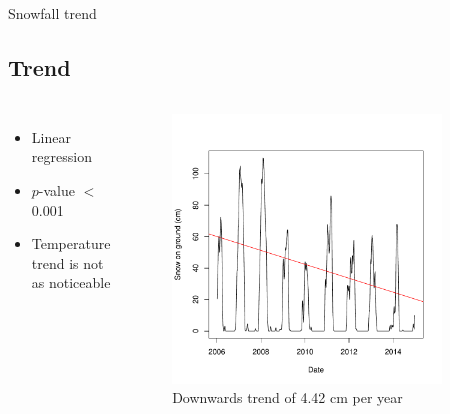 \documentclass{beamer}
\begin{document}
\begin{frame}{Snowfall trend}

\subsection{Trend}

\begin{columns}


{\small
\begin{itemize}
\item Linear regression
\item $p$-value $<$ 0.001
\item Temperature trend is not as noticeable
\end{itemize}
}

\vspace{30mm}


\vspace{-18mm}
\begin{figure}
\includegraphics[width=0.9\textwidth]{report-snowtrend}
\vspace{-2mm}
\caption{{\footnotesize Downwards trend of 4.42 cm per year}}
\vspace{10mm}
\end{figure}

\end{columns}

\end{frame}
\end{document}
